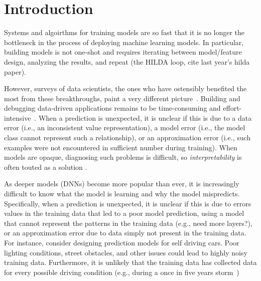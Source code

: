 \section{Introduction}\label{intro}

Systems and algoirthms for training models are so fast that it is no longer the bottleneck in the process of deploying machine learning models.
In particular, building models is not one-shot and requires iterating between model/feature design, analyzing the results, and repeat (the HILDA loop, cite last year's hilda paper).

However, surveys of data scientists, the ones who have ostensibly benefited the most from these breakthroughs, paint a very different picture~\cite{kandel2012, krishnan2016hilda}.
Building and debugging data-driven applications remains to be time-consuming and effort-intensive~\cite{sculley2014machine}.
When a prediction is unexpected, it is unclear if this is due to a data error (i.e., an inconsistent value representation), a model error (i.e., the model class cannot represent such a relationship), or an approximation error (i.e., such examples were not encountered in sufficient number during training).
When models are opaque, diagnosing such problems is difficult, so \emph{interpretability} is often touted as a solution \cite{?}.


As deeper models (DNNs) become more popular than ever, it is increasingly difficult to know what the model is learning and why the model mispredicts.
Specifically, when a prediction is unexpected, it is unclear if this is due to errors values in the training data that led to a poor model prediction, using a model  that cannot represent the patterns in the training data (e.g., need more layers?),  or an approximation error due to data simply not present in the training data.
For instance, consider designing prediction models for self driving cars.  
Poor lighting conditions, street obstacles, and other issues could lead to highly noisy training data.
Furthermore, it is unlikely that the training data has collected data for every possible driving condition (e.g., during a once in five years storm~\cite{bayareastormin2017})

